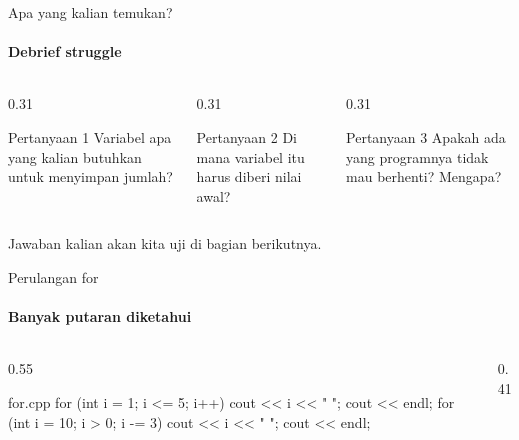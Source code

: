 \documentclass[t]{beamer}
\begin{document}
\begin{frame}{Apa yang kalian temukan?}
\framesubtitle{Debrief struggle}
\begin{columns}[T]
\begin{column}{0.31\textwidth}
\begin{BlokGelap}{Pertanyaan 1}
Variabel apa yang kalian butuhkan untuk menyimpan jumlah?
\end{BlokGelap}
\end{column}
\begin{column}{0.31\textwidth}
\begin{BlokGelap}{Pertanyaan 2}
Di mana variabel itu harus diberi nilai awal?
\end{BlokGelap}
\end{column}
\begin{column}{0.31\textwidth}
\begin{BlokGelap}{Pertanyaan 3}
Apakah ada yang programnya tidak mau berhenti? Mengapa?
\end{BlokGelap}
\end{column}
\end{columns}
\vspace{10pt}
Jawaban kalian akan kita uji di bagian berikutnya.
\end{frame}


\begin{frame}[fragile]{Perulangan for}
\framesubtitle{Banyak putaran diketahui}
\begin{columns}[T]
\begin{column}{0.55\textwidth}
\begin{Kode}[]{for.cpp}
for (int i = 1; i <= 5; i++) {
    cout << i << " ";
}
cout << endl;
for (int i = 10; i > 0; i -= 3) {
    cout << i << " ";
}
cout << endl;
\end{Kode}
\end{column}
\begin{column}{0.41\textwidth}
\end{column}
\end{columns}
\end{frame}
\end{document}
